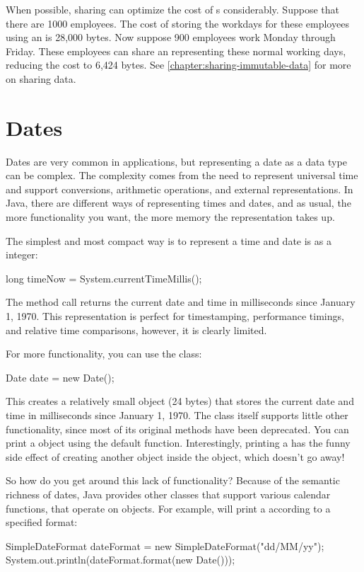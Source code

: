 When possible, sharing can optimize the cost of 
 s considerably. Suppose
that there are 1000 employees. The cost of storing the workdays for these
employees using an  is 28,000 bytes. 
Now suppose 900 employees work Monday
through Friday. These employees can share an  representing
these normal working days, reducing the cost to 6,424 bytes.  See \autoref{chapter:sharing-immutable-data}
for more on sharing data.


\section{Dates}

Dates are very common in applications, but representing a date as a data type
can be complex. The complexity comes from the need to represent
universal time  and support conversions, arithmetic operations, and external
representations. In Java, there are different ways of representing times and
dates, and as usual, the more functionality you want, the more memory the
representation takes up.

The simplest and most compact way is to represent a time and date is as a
 integer:
\begin{shortlisting}
    long timeNow = System.currentTimeMillis();
\end{shortlisting}
The method call  returns the current 
date and time in milliseconds since January 1, 1970.  This representation is
perfect for timestamping, performance timings, and relative time
comparisons, however, it is clearly limited.  

For more functionality, you can use the  class:
\begin{shortlisting}
    Date date = new Date();
\end{shortlisting}
This creates a relatively small object (24 bytes) that stores the current date
and time in milliseconds since January 1, 1970. The class  itself
supports little other functionality, since most of its original methods have
been deprecated. You can print a  object using the default
 function. Interestingly, printing a  has the funny
side effect of creating another object inside the  object, which
doesn't go away!

So how do you get around this lack of functionality?
Because of the semantic richness of dates, Java provides other classes that
support various calendar functions, that operate on  objects. For
example,  will print a  according to a
specified format:
\begin{shortlisting}
    SimpleDateFormat dateFormat =  new SimpleDateFormat("dd/MM/yy"); 
    System.out.println(dateFormat.format(new Date())); 
\end{shortlisting}

